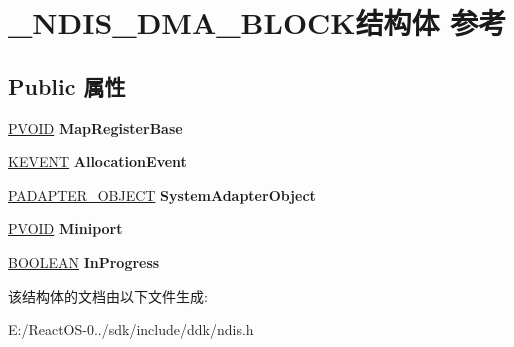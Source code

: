 \hypertarget{struct___n_d_i_s___d_m_a___b_l_o_c_k}{}\section{\+\_\+\+N\+D\+I\+S\+\_\+\+D\+M\+A\+\_\+\+B\+L\+O\+C\+K结构体 参考}
\label{struct___n_d_i_s___d_m_a___b_l_o_c_k}
\subsection*{Public 属性}
\begin{DoxyCompactItemize}
\item 
\mbox{\label{struct___n_d_i_s___d_m_a___b_l_o_c_k_a3fa15f44cd0be0bda5a2c41c75bd2fd7}} 
\hyperlink{interfacevoid}{P\+V\+O\+ID} {\bfseries Map\+Register\+Base}
\item 
\mbox{\label{struct___n_d_i_s___d_m_a___b_l_o_c_k_aed4a1838c90fdca46350e6536f352a9b}} 
\hyperlink{struct___k_e_v_e_n_t}{K\+E\+V\+E\+NT} {\bfseries Allocation\+Event}
\item 
\mbox{\label{struct___n_d_i_s___d_m_a___b_l_o_c_k_a40f91c8e3425a9feaa6b6a2534d0297f}} 
\hyperlink{struct___d_m_a___a_d_a_p_t_e_r}{P\+A\+D\+A\+P\+T\+E\+R\+\_\+\+O\+B\+J\+E\+CT} {\bfseries System\+Adapter\+Object}
\item 
\mbox{\label{struct___n_d_i_s___d_m_a___b_l_o_c_k_a8c38f585dbdfe1977f6bebf187a4da3c}} 
\hyperlink{interfacevoid}{P\+V\+O\+ID} {\bfseries Miniport}
\item 
\mbox{\label{struct___n_d_i_s___d_m_a___b_l_o_c_k_a4dbda99bfd1c2dae23c479ad69930c5e}} 
\hyperlink{_processor_bind_8h_a112e3146cb38b6ee95e64d85842e380a}{B\+O\+O\+L\+E\+AN} {\bfseries In\+Progress}
\end{DoxyCompactItemize}


该结构体的文档由以下文件生成\+:\begin{DoxyCompactItemize}
\item 
E\+:/\+React\+O\+S-\/0../sdk/include/ddk/ndis.\+h\end{DoxyCompactItemize}
